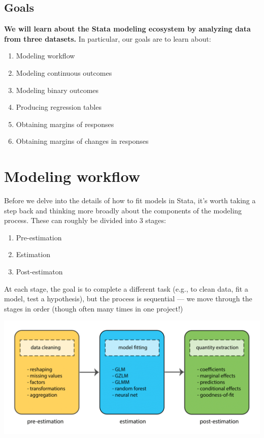 \documentclass[
]{book}
\providecommand{\tightlist}{%
  \setlength{\itemsep}{0pt}\setlength{\parskip}{0pt}}
\begin{document}
\hypertarget{goals-7}{%
\subsection{Goals}\label{goals-7}}

\begin{alert}

\textbf{We will learn about the Stata modeling ecosystem by analyzing data from three datasets.} In particular, our goals are to learn about:

\begin{enumerate}
\def\labelenumi{\arabic{enumi}.}
\tightlist
\item
  Modeling workflow
\item
  Modeling continuous outcomes\\
\item
  Modeling binary outcomes
\item
  Producing regression tables
\item
  Obtaining margins of responses
\item
  Obtaining margins of changes in responses
\end{enumerate}

\end{alert}

\hypertarget{modeling-workflow-1}{%
\section{Modeling workflow}\label{modeling-workflow-1}}

Before we delve into the details of how to fit models in Stata, it's worth taking a step back and thinking more broadly about the components of the modeling process. These can roughly be divided into 3 stages:

\begin{enumerate}
\def\labelenumi{\arabic{enumi}.}
\tightlist
\item
  Pre-estimation
\item
  Estimation
\item
  Post-estimaton
\end{enumerate}

At each stage, the goal is to complete a different task (e.g., to clean data, fit a model, test a hypothesis),
but the process is sequential --- we move through the stages in order (though often many times in one project!)

\includegraphics{Stata/StataModels/images/Stata_model_pipeline.png}
\end{document}
